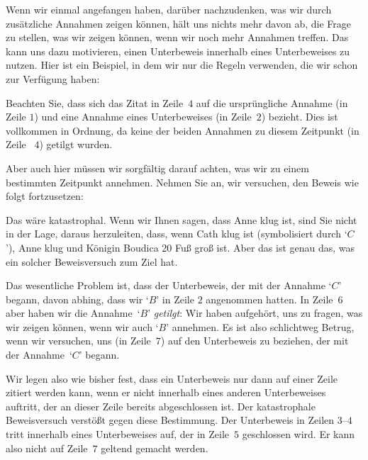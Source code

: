 Wenn wir einmal angefangen haben, darüber nachzudenken, was wir durch zusätzliche Annahmen zeigen können, hält uns nichts mehr davon ab, die Frage zu stellen, was wir zeigen können, wenn wir noch mehr Annahmen treffen. Das kann uns dazu motivieren, einen Unterbeweis innerhalb eines Unterbeweises zu nutzen. Hier ist ein Beispiel, in dem wir nur die Regeln verwenden, die wir schon zur Verfügung haben: 
\begin{fitchproof}
\open
	\open
	\close
\close
{}
\end{fitchproof}
Beachten Sie, dass sich das Zitat in Zeile~$4$ auf die ursprüngliche Annahme (in Zeile $1$) und eine Annahme eines Unterbeweises (in Zeile~$2$) bezieht. Dies ist vollkommen in Ordnung, da keine der beiden Annahmen zu diesem Zeitpunkt (in Zeile ~$4$) getilgt wurden.

Aber auch hier müssen wir sorgfältig darauf achten, was wir zu einem bestimmten Zeitpunkt annehmen. Nehmen Sie an, wir versuchen, den Beweis wie folgt fortzusetzen:
\begin{fitchproof}
\open
	\open
	\close
\close
{}
 
\end{fitchproof}
Das wäre katastrophal. Wenn wir Ihnen sagen, dass Anne klug ist, sind Sie nicht in der Lage, daraus herzuleiten, dass, wenn Cath klug ist (symbolisiert durch `$C$'), Anne klug und Königin Boudica 20 Fu{\ss} gro{\ss} ist. Aber das ist genau das, was ein solcher Beweisversuch zum Ziel hat.

Das wesentliche Problem ist, dass der Unterbeweis, der mit der Annahme `$C$' begann, davon abhing, dass wir `$B$' in Zeile $2$ angenommen hatten. In Zeile~$6$ aber haben wir die Annahme~`$B$' \emph{getilgt}: Wir haben aufgehört, uns zu fragen, was wir zeigen können, wenn wir auch `$B$' annehmen. Es ist also schlichtweg Betrug, wenn wir versuchen, uns (in Zeile~$7$) auf den Unterbeweis zu beziehen, der mit der Annahme~`$C$' begann. 

Wir legen also wie bisher fest, dass ein Unterbeweis nur dann auf einer Zeile zitiert werden kann, wenn er nicht innerhalb eines anderen Unterbeweises auftritt, der an dieser Zeile bereits abgeschlossen ist. Der katastrophale Beweisversuch verstö{\ss}t gegen diese Bestimmung. Der Unterbeweis in Zeilen $3$--$4$ tritt innerhalb eines Unterbeweises auf, der in Zeile~$5$ geschlossen wird. Er kann also nicht auf Zeile~$7$ geltend gemacht werden.

